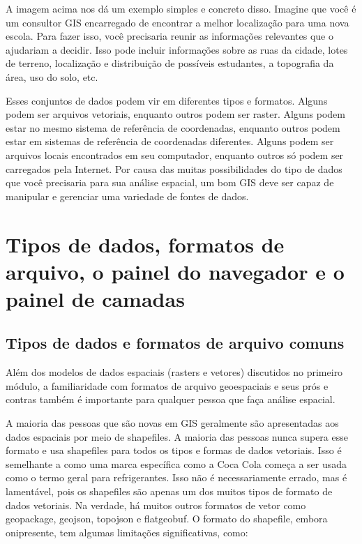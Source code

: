 \documentclass[
]{krantz}
\begin{document}
A imagem acima nos dá um exemplo simples e concreto disso. Imagine que você é um consultor GIS encarregado de encontrar a melhor localização para uma nova escola. Para fazer isso, você precisaria reunir as informações relevantes que o ajudariam a decidir. Isso pode incluir informações sobre as ruas da cidade, lotes de terreno, localização e distribuição de possíveis estudantes, a topografia da área, uso do solo, etc.

Esses conjuntos de dados podem vir em diferentes tipos e formatos. Alguns podem ser arquivos vetoriais, enquanto outros podem ser raster. Alguns podem estar no mesmo sistema de referência de coordenadas, enquanto outros podem estar em sistemas de referência de coordenadas diferentes. Alguns podem ser arquivos locais encontrados em seu computador, enquanto outros só podem ser carregados pela Internet. Por causa das muitas possibilidades do tipo de dados que você precisaria para sua análise espacial, um bom GIS deve ser capaz de manipular e gerenciar uma variedade de fontes de dados.

\hypertarget{tipos-de-dados-formatos-de-arquivo-o-painel-do-navegador-e-o-painel-de-camadas}{%
\section{Tipos de dados, formatos de arquivo, o painel do navegador e o painel de camadas}\label{tipos-de-dados-formatos-de-arquivo-o-painel-do-navegador-e-o-painel-de-camadas}}

\hypertarget{tipos-de-dados-e-formatos-de-arquivo-comuns}{%
\subsection{Tipos de dados e formatos de arquivo comuns}\label{tipos-de-dados-e-formatos-de-arquivo-comuns}}

Além dos modelos de dados espaciais (rasters e vetores) discutidos no primeiro módulo, a familiaridade com formatos de arquivo geoespaciais e seus prós e contras também é importante para qualquer pessoa que faça análise espacial.

A maioria das pessoas que são novas em GIS geralmente são apresentadas aos dados espaciais por meio de shapefiles. A maioria das pessoas nunca supera esse formato e usa shapefiles para todos os tipos e formas de dados vetoriais. Isso é semelhante a como uma marca específica como a Coca Cola começa a ser usada como o termo geral para refrigerantes. Isso não é necessariamente errado, mas é lamentável, pois os shapefiles são apenas um dos muitos tipos de formato de dados vetoriais. Na verdade, há muitos outros formatos de vetor como geopackage, geojson, topojson e flatgeobuf. O formato do shapefile, embora onipresente, tem algumas limitações significativas, como:
\end{document}
